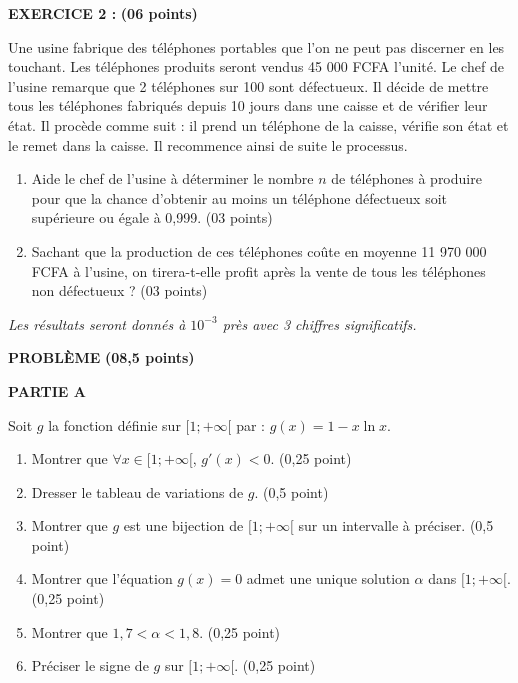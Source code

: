 \documentclass[11pt]{article}
\begin{document}
\vspace{0.5cm}
\noindent
\textbf{EXERCICE 2 :} \textbf{(06 points)}

\noindent
Une usine fabrique des téléphones portables que l’on ne peut pas discerner en les touchant. Les téléphones produits seront vendus 45 000 FCFA l’unité. Le chef de l’usine remarque que 2 téléphones sur 100 sont défectueux. Il décide de mettre tous les téléphones fabriqués depuis 10 jours dans une caisse et de vérifier leur état. Il procède comme suit : il prend un téléphone de la caisse, vérifie son état et le remet dans la caisse. Il recommence ainsi de suite le processus.

\begin{enumerate}
    \item Aide le chef de l’usine à déterminer le nombre \( n \) de téléphones à produire pour que la chance d’obtenir au moins un téléphone défectueux soit supérieure ou égale à 0,999. \hfill (03 points)
    
    \item Sachant que la production de ces téléphones coûte en moyenne 11 970 000 FCFA à l’usine, on tirera-t-elle profit après la vente de tous les téléphones non défectueux ? \hfill (03 points)
\end{enumerate}

\vspace{0.4cm}
\noindent
\textit{Les résultats seront donnés à \( 10^{-3} \) près avec 3 chiffres significatifs.}

\vspace{0.2cm}
\textbf{PROBLÈME} \textbf{(08,5 points)}

\vspace{0.4cm}
\noindent
\textbf{PARTIE A}

\noindent
Soit \( g \) la fonction définie sur \( [1; +\infty[ \) par : \( g(x) = 1 - x \ln x \).

\begin{enumerate}
    \item Montrer que \( \forall x \in [1; +\infty[ \), \( g'(x) < 0 \). \hfill (0,25 point)
    \item Dresser le tableau de variations de \( g \). \hfill (0,5 point)
    \item Montrer que \( g \) est une bijection de \( [1; +\infty[ \) sur un intervalle à préciser. \hfill (0,5 point)
    \item Montrer que l’équation \( g(x) = 0 \) admet une unique solution \( \alpha \) dans \( [1; +\infty[ \). \hfill (0,25 point)
    \item Montrer que \( 1{,}7 < \alpha < 1{,}8 \). \hfill (0,25 point)
    \item Préciser le signe de \( g \) sur \( [1; +\infty[ \). \hfill (0,25 point)
\end{enumerate}
\end{document}
